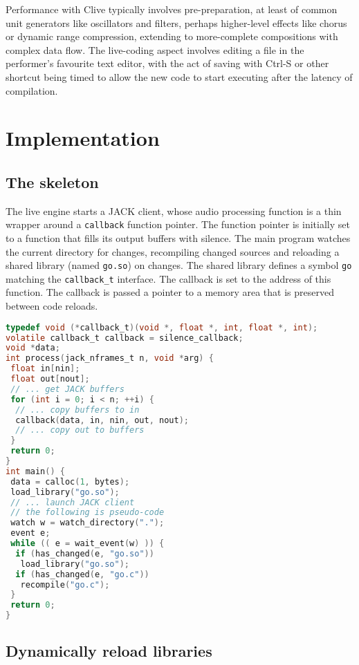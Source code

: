 \documentclass[11pt,a4paper]{article}
\begin{document}
Performance with Clive typically involves pre-preparation, at least of
common unit generators like oscillators and filters, perhaps higher-level
effects like chorus or dynamic range compression, extending to more-complete
compositions with complex data flow.  The live-coding aspect involves editing
a file in the performer's favourite text editor, with the act of saving with
Ctrl-S or other shortcut being timed to allow the new code to start executing
after the latency of compilation.

\section{Implementation}\label{implementation}

\subsection{The skeleton}\label{the-skeleton}

The live engine starts a JACK client, whose audio processing function is
a thin wrapper around a \lstinline!callback! function pointer. The
function pointer is initially set to a function that fills its output
buffers with silence. The main program watches the current directory for
changes, recompiling changed sources and reloading a shared library
(named \lstinline!go.so!) on changes. The shared library defines a
symbol \lstinline!go! matching the \lstinline!callback_t! interface. The
callback is set to the address of this function. The callback is passed
a pointer to a memory area that is preserved between code reloads.

\begin{lstlisting}[language=C, caption={The skeleton}, label=lskeleton]
typedef void (*callback_t)(void *, float *, int, float *, int);
volatile callback_t callback = silence_callback;
void *data;
int process(jack_nframes_t n, void *arg) {
 float in[nin];
 float out[nout];
 // ... get JACK buffers
 for (int i = 0; i < n; ++i) {
  // ... copy buffers to in
  callback(data, in, nin, out, nout);
  // ... copy out to buffers
 }
 return 0;
}
int main() {
 data = calloc(1, bytes);
 load_library("go.so");
 // ... launch JACK client
 // the following is pseudo-code
 watch w = watch_directory(".");
 event e;
 while (( e = wait_event(w) )) {
  if (has_changed(e, "go.so"))
   load_library("go.so");
  if (has_changed(e, "go.c"))
   recompile("go.c");
 }
 return 0;
}
\end{lstlisting}

\subsection{Dynamically reload
libraries}\label{dynamically-reload-libraries}
\end{document}
